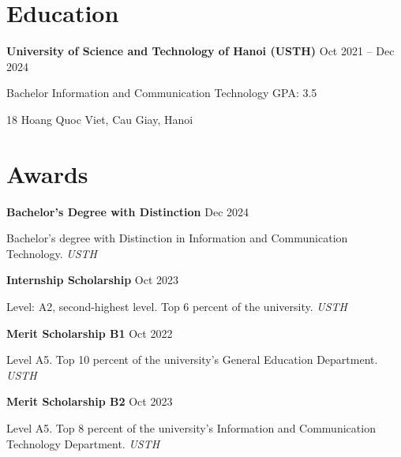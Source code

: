 \documentclass[10pt,a4paper]{article}
\begin{document}
\vspace{2pt}



\section*{ Education }


\textbf{ University of Science and Technology of Hanoi (USTH) }
\hfill
Oct 2021 -- Dec 2024

Bachelor Information and Communication Technology
\hfill
GPA: 3.5

18 Hoang Quoc Viet, Cau Giay, Hanoi

\vspace{4pt}




\section*{ Awards }


\textbf{ Bachelor's Degree with Distinction }
\hfill
Dec 2024

Bachelor's degree with Distinction in Information and Communication Technology.
\hfill
\textit{ USTH }

\vspace{4pt}


\textbf{ Internship Scholarship }
\hfill
Oct 2023

Level: A2, second-highest level. Top 6 percent of the university.
\hfill
\textit{ USTH }

\vspace{4pt}


\textbf{ Merit Scholarship B1 }
\hfill
Oct 2022

Level A5. Top 10 percent of the university's General Education Department.
\hfill
\textit{ USTH }

\vspace{4pt}


\textbf{ Merit Scholarship B2 }
\hfill
Oct 2023

Level A5. Top 8 percent of the university's Information and Communication Technology Department.
\hfill
\textit{ USTH }

\vspace{4pt}


\end{document}
